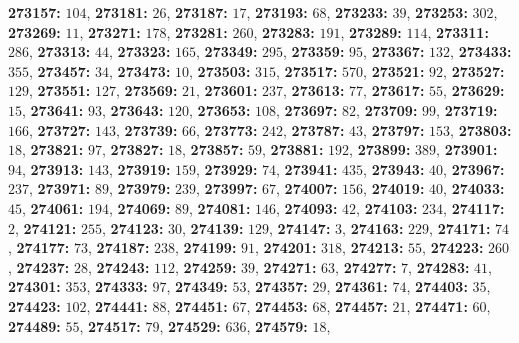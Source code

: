 \textsf{\bfseries 273157:} $104$, \textsf{\bfseries 273181:} $26$, \textsf{\bfseries 273187:} $17$, \textsf{\bfseries 273193:} $68$, \textsf{\bfseries 273233:} $39$, \textsf{\bfseries 273253:} $302$, \textsf{\bfseries 273269:} $11$, \textsf{\bfseries 273271:} $178$, \textsf{\bfseries 273281:} $260$, \textsf{\bfseries 273283:} $191$, \textsf{\bfseries 273289:} $114$, \textsf{\bfseries 273311:} $286$, \textsf{\bfseries 273313:} $44$, \textsf{\bfseries 273323:} $165$, \textsf{\bfseries 273349:} $295$, \textsf{\bfseries 273359:} $95$, \textsf{\bfseries 273367:} $132$, \textsf{\bfseries 273433:} $355$, \textsf{\bfseries 273457:} $34$, \textsf{\bfseries 273473:} $10$, \textsf{\bfseries 273503:} $315$, \textsf{\bfseries 273517:} $570$, \textsf{\bfseries 273521:} $92$, \textsf{\bfseries 273527:} $129$, \textsf{\bfseries 273551:} $127$, \textsf{\bfseries 273569:} $21$, \textsf{\bfseries 273601:} $237$, \textsf{\bfseries 273613:} $77$, \textsf{\bfseries 273617:} $55$, \textsf{\bfseries 273629:} $15$, \textsf{\bfseries 273641:} $93$, \textsf{\bfseries 273643:} $120$, \textsf{\bfseries 273653:} $108$, \textsf{\bfseries 273697:} $82$, \textsf{\bfseries 273709:} $99$, \textsf{\bfseries 273719:} $166$, \textsf{\bfseries 273727:} $143$, \textsf{\bfseries 273739:} $66$, \textsf{\bfseries 273773:} $242$, \textsf{\bfseries 273787:} $43$, \textsf{\bfseries 273797:} $153$, \textsf{\bfseries 273803:} $18$, \textsf{\bfseries 273821:} $97$, \textsf{\bfseries 273827:} $18$, \textsf{\bfseries 273857:} $59$, \textsf{\bfseries 273881:} $192$, \textsf{\bfseries 273899:} $389$, \textsf{\bfseries 273901:} $94$, \textsf{\bfseries 273913:} $143$, \textsf{\bfseries 273919:} $159$, \textsf{\bfseries 273929:} $74$, \textsf{\bfseries 273941:} $435$, \textsf{\bfseries 273943:} $40$, \textsf{\bfseries 273967:} $237$, \textsf{\bfseries 273971:} $89$, \textsf{\bfseries 273979:} $239$, \textsf{\bfseries 273997:} $67$, \textsf{\bfseries 274007:} $156$, \textsf{\bfseries 274019:} $40$, \textsf{\bfseries 274033:} $45$, \textsf{\bfseries 274061:} $194$, \textsf{\bfseries 274069:} $89$, \textsf{\bfseries 274081:} $146$, \textsf{\bfseries 274093:} $42$, \textsf{\bfseries 274103:} $234$, \textsf{\bfseries 274117:} $2$, \textsf{\bfseries 274121:} $255$, \textsf{\bfseries 274123:} $30$, \textsf{\bfseries 274139:} $129$, \textsf{\bfseries 274147:} $3$, \textsf{\bfseries 274163:} $229$, \textsf{\bfseries 274171:} $74$, \textsf{\bfseries 274177:} $73$, \textsf{\bfseries 274187:} $238$, \textsf{\bfseries 274199:} $91$, \textsf{\bfseries 274201:} $318$, \textsf{\bfseries 274213:} $55$, \textsf{\bfseries 274223:} $260$, \textsf{\bfseries 274237:} $28$, \textsf{\bfseries 274243:} $112$, \textsf{\bfseries 274259:} $39$, \textsf{\bfseries 274271:} $63$, \textsf{\bfseries 274277:} $7$, \textsf{\bfseries 274283:} $41$, \textsf{\bfseries 274301:} $353$, \textsf{\bfseries 274333:} $97$, \textsf{\bfseries 274349:} $53$, \textsf{\bfseries 274357:} $29$, \textsf{\bfseries 274361:} $74$, \textsf{\bfseries 274403:} $35$, \textsf{\bfseries 274423:} $102$, \textsf{\bfseries 274441:} $88$, \textsf{\bfseries 274451:} $67$, \textsf{\bfseries 274453:} $68$, \textsf{\bfseries 274457:} $21$, \textsf{\bfseries 274471:} $60$, \textsf{\bfseries 274489:} $55$, \textsf{\bfseries 274517:} $79$, \textsf{\bfseries 274529:} $636$, \textsf{\bfseries 274579:} $18$, 

